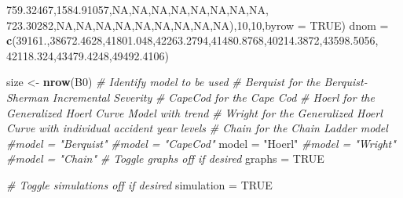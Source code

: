\documentclass[]{article}
\newenvironment{Shaded}{\begin{snugshade}}{\end{snugshade}}
\newcommand{\CommentTok}[1]{\textcolor[rgb]{0.56,0.35,0.01}{\textit{#1}}}
\newcommand{\DataTypeTok}[1]{\textcolor[rgb]{0.13,0.29,0.53}{#1}}
\newcommand{\DecValTok}[1]{\textcolor[rgb]{0.00,0.00,0.81}{#1}}
\newcommand{\FloatTok}[1]{\textcolor[rgb]{0.00,0.00,0.81}{#1}}
\newcommand{\KeywordTok}[1]{\textcolor[rgb]{0.13,0.29,0.53}{\textbf{#1}}}
\newcommand{\NormalTok}[1]{#1}
\newcommand{\OtherTok}[1]{\textcolor[rgb]{0.56,0.35,0.01}{#1}}
\newcommand{\StringTok}[1]{\textcolor[rgb]{0.31,0.60,0.02}{#1}}
\begin{document}
\begin{Shaded}
\begin{Highlighting}[]
            \FloatTok{759.32467}\NormalTok{,}\FloatTok{1584.91057}\NormalTok{,}\OtherTok{NA}\NormalTok{,}\OtherTok{NA}\NormalTok{,}\OtherTok{NA}\NormalTok{,}\OtherTok{NA}\NormalTok{,}\OtherTok{NA}\NormalTok{,}\OtherTok{NA}\NormalTok{,}\OtherTok{NA}\NormalTok{,}\OtherTok{NA}\NormalTok{,}
            \FloatTok{723.30282}\NormalTok{,}\OtherTok{NA}\NormalTok{,}\OtherTok{NA}\NormalTok{,}\OtherTok{NA}\NormalTok{,}\OtherTok{NA}\NormalTok{,}\OtherTok{NA}\NormalTok{,}\OtherTok{NA}\NormalTok{,}\OtherTok{NA}\NormalTok{,}\OtherTok{NA}\NormalTok{,}\OtherTok{NA}\NormalTok{),}\DecValTok{10}\NormalTok{,}\DecValTok{10}\NormalTok{,}\DataTypeTok{byrow =} \OtherTok{TRUE}\NormalTok{)}
\NormalTok{dnom =}\StringTok{ }\KeywordTok{c}\NormalTok{(}\FloatTok{39161.}\NormalTok{,}\FloatTok{38672.4628}\NormalTok{,}\FloatTok{41801.048}\NormalTok{,}\FloatTok{42263.2794}\NormalTok{,}\FloatTok{41480.8768}\NormalTok{,}\FloatTok{40214.3872}\NormalTok{,}\FloatTok{43598.5056}\NormalTok{,}
       \FloatTok{42118.324}\NormalTok{,}\FloatTok{43479.4248}\NormalTok{,}\FloatTok{49492.4106}\NormalTok{)}

\NormalTok{size <-}\StringTok{ }\KeywordTok{nrow}\NormalTok{(B0)}
\CommentTok{# Identify model to be used}
\CommentTok{#   Berquist for the Berquist-Sherman Incremental Severity}
\CommentTok{#   CapeCod for the Cape Cod}
\CommentTok{#   Hoerl for the Generalized Hoerl Curve Model with trend}
\CommentTok{#   Wright for the Generalized Hoerl Curve with individual accident year levels}
\CommentTok{#   Chain for the Chain Ladder model}
\CommentTok{#model = "Berquist"}
\CommentTok{#model = "CapeCod"}
\NormalTok{model =}\StringTok{ "Hoerl"}
\CommentTok{#model = "Wright"}
\CommentTok{#model = "Chain"}
\CommentTok{# Toggle graphs off if desired}
\NormalTok{graphs =}\StringTok{ }\OtherTok{TRUE}

\CommentTok{# Toggle simulations off if desired}
\NormalTok{simulation =}\StringTok{ }\OtherTok{TRUE}
\end{Highlighting}
\end{Shaded}
\end{document}
